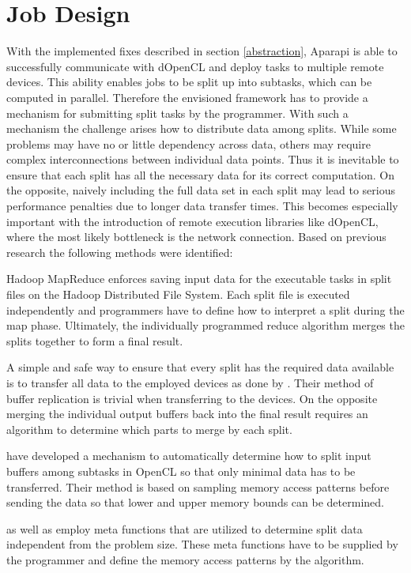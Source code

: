\section{Job Design}
\label{job_design}
With the implemented fixes described in section \ref{abstraction}, Aparapi is able to successfully communicate with dOpenCL and deploy tasks to multiple remote devices. This ability enables jobs to be split up into subtasks, which can be computed in parallel. Therefore the envisioned framework has to provide a mechanism for submitting split tasks by the programmer. With such a mechanism the challenge arises how to distribute data among splits. While some problems may have no or little dependency across data, others may require complex interconnections between individual data points. Thus it is inevitable to ensure that each split has all the necessary data for its correct computation. On the opposite, naively including the full data set in each split may lead to serious performance penalties due to longer data transfer times. This becomes especially important with the introduction of remote execution libraries like dOpenCL, where the most likely bottleneck is the network connection. Based on previous research the following methods were identified:

\begin{description}[style=nextline]
	\item [Manual Splits]
	Hadoop MapReduce enforces saving input data for the executable tasks in split files on the Hadoop Distributed File System. Each split file is executed independently and programmers have to define how to interpret a split during the map phase. Ultimately, the individually programmed reduce algorithm merges the splits together to form a final result.

	\item [Naive Buffer Replication]
	A simple and safe way to ensure that every split has the required data available is to transfer all data to the employed devices as done by \citeauthor{delalama_2012}\cite{delalama_2012}. Their method of buffer replication is trivial when transferring to the devices. On the opposite merging the individual output buffers back into the final result requires an algorithm to determine which parts to merge by each split.

	\item [Intelligent Buffer Replication]
	\citeauthor{Kim_2011}\cite{Kim_2011} have developed a mechanism to automatically determine how to split input buffers among subtasks in OpenCL so that only minimal data has to be transferred. Their method is based on sampling memory access patterns before sending the data so that lower and upper memory bounds can be determined.

	\item [Meta Functions]
	\citeauthor{stepocl}\cite{stepocl} as well as \citeauthor{distcl}\cite{distcl} employ meta functions that are utilized to determine split data independent from the problem size. These meta functions have to be supplied by the programmer and define the memory access patterns by the algorithm.

\end{description}

